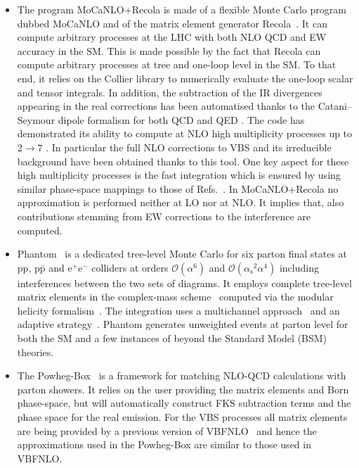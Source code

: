 \documentclass[twocolumn,epjc3]{svjour3} %
\newcommand{\Pp}{\ensuremath{\text{p}}\xspace}
\newcommand{\Pe}{\ensuremath{\text{e}}\xspace}
\newcommand{\alphas}{\ensuremath{\alpha_\text{s}}\xspace}
\begin{document}
\begin{itemize}
    \item The program {\sc MoCaNLO+Recola} is made of a flexible Monte Carlo program dubbed {\sc MoCaNLO} and of the matrix element generator {\sc Recola}~\cite{Actis:2012qn,Actis:2016mpe}.
    It can compute arbitrary processes at the LHC with both NLO QCD and EW accuracy in the SM.
    This is made possible by the fact that {\sc Recola} can compute arbitrary processes at tree and one-loop level in the SM.
    To that end, it relies on the {\sc Collier} library \cite{Denner:2014gla,Denner:2016kdg} to numerically evaluate the one-loop scalar and tensor integrals.
    In addition, the subtraction of the IR divergences appearing in the real corrections has been automatised thanks to the Catani--Seymour dipole formalism for both QCD and QED \cite{Catani:1996vz,Dittmaier:1999mb}.
    The code has demonstrated its ability to compute at NLO high multiplicity processes up to $2 \to 7$ \cite{Denner:2015yca,Denner:2016wet}.
    In particular the full NLO corrections to VBS and its irreducible background \cite{Biedermann:2016yds,Biedermann:2017bss} have been obtained thanks to this tool.
    One key aspect for these high multiplicity processes is the fast integration which is ensured by using similar phase-space mappings to those of Refs.~\cite{Berends:1994pv,Denner:1999gp,Dittmaier:2002ap}. 
    In {\sc MoCaNLO+Recola} no approximation is performed neither at LO nor at NLO.
    It implies that, also contributions stemming from EW corrections to the interference are computed.

      \item {\sc Phantom}~\cite{Ballestrero:2007xq} is a dedicated tree-level Monte Carlo for six parton final states 
      at $\Pp \Pp,\, \Pp\bar{\Pp}$ and $\Pe^+\Pe^-$ colliders at orders $\mathcal O(\alpha^6)$ and $\mathcal O(\alphas^2\alpha^4)$ including interferences between the two sets of diagrams.
    It employs complete tree-level matrix elements in the complex-mass scheme~\cite{Denner:1999gp,Denner:2005fg,Denner:2006ic} computed via the modular helicity formalism~\cite{Ballestrero:1999md,Ballestrero:1994jn}.
    The integration uses a multichannel approach~\cite{Berends:1984gf} and an adaptive strategy~\cite{Lepage:1977sw}.
    {\sc Phantom} generates unweighted events at parton level for both the SM and a few instances of beyond the Standard Model (BSM) theories.

      \item The {\sc Powheg-Box}~\cite{Nason:2004rx,Frixione:2007vw,Alioli:2010xd} is a framework for matching NLO-QCD calculations with parton showers.
    It relies on the user providing the matrix elements and Born phase-space, but will automatically construct FKS \cite{Frixione:1995ms} subtraction terms and the phase space for the real emission.
    For the VBS processes all matrix elements are being provided by a previous version of {\sc VBFNLO}~\cite{Arnold:2008rz, Arnold:2011wj, Baglio:2014uba} and hence the approximations used in the {\sc Powheg-Box} are similar to those used in {\sc VBFNLO}.


\end{itemize}
\end{document}
